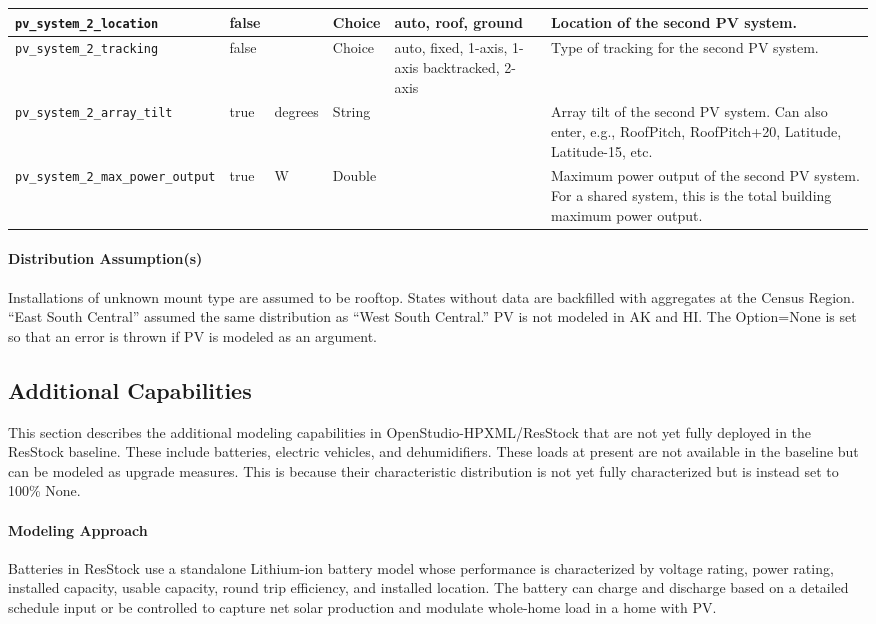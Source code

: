\begin{longtable}[]{|p{}|p{1.5cm}|p{1.5cm}|p{1.1cm}|p{2.4cm}|p{4.5cm}|}
\hline
\texttt{pv\_system\_2\_location} & false & & Choice & auto, roof, ground
& Location of the second PV system.  \\
\hline
\texttt{pv\_system\_2\_tracking} & false & & Choice & auto, fixed,
1-axis, 1-axis backtracked, 2-axis & Type of tracking for the second PV
system.  \\
\hline
\texttt{pv\_system\_2\_array\_tilt} & true & degrees & String & & Array
tilt of the second PV system. Can also enter, e.g., RoofPitch,
RoofPitch+20, Latitude, Latitude-15, etc. \\
\hline
\texttt{pv\_system\_2\_max\_power\_output} & true & W & Double & &
Maximum power output of the second PV system. For a shared system, this
is the total building maximum power output. \\
\end{longtable}

\paragraph{Distribution Assumption(s)}
Installations of unknown mount type are assumed to be rooftop. States without data are backfilled with aggregates at the Census Region. ``East South Central'' assumed the same distribution as ``West South Central.''
PV is not modeled in AK and HI. The Option=None is set so that an error is thrown if PV is modeled as an argument.

\subsection{Additional Capabilities}
This section describes the additional modeling capabilities in OpenStudio-HPXML/ResStock that are not yet fully deployed in the ResStock baseline. These include batteries, electric vehicles, and dehumidifiers. These loads at present are not available in the baseline but can be modeled as upgrade measures. This is because their characteristic distribution is not yet fully characterized but is instead set to 100\% None.

\paragraph{Modeling Approach}
Batteries in ResStock use a standalone Lithium-ion battery model whose performance is characterized by voltage rating, power rating, installed capacity, usable capacity, round trip efficiency, and installed location. The battery can charge and discharge based on a detailed schedule input or be controlled to capture net solar production and modulate whole-home load in a home with PV.


